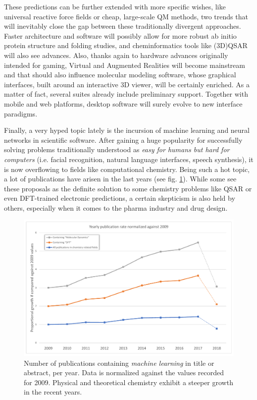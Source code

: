 These predictions can be further extended with more specific wishes, like universal reactive force fields or cheap, large-scale QM methods, two trends that will inevitably close the gap between these traditionally divergent approaches. Faster architecture and software will possibly allow for more robust ab initio protein structure and folding studies,\cite{Lee2017} and cheminformatics tools like (3D)QSAR will also see advances.\cite{Cherkasov2013} Also, thanks again to hardware advances originally intended for gaming, Virtual and Augmented Realities will become mainstream and that should also influence molecular modeling software, whose graphical interfaces, built around an interactive 3D viewer, will be certainly enriched. As a matter of fact, several suites already include preliminary support.\cite{chimerax} Together with mobile and web platforms, desktop software will surely evolve to new interface paradigms.

Finally, a very hyped topic lately is the incursion of machine learning and neural networks in scientific software. After gaining a huge popularity for successfully solving problems traditionally understood as \textit{easy for humans but hard for computers} (i.e. facial recognition, natural language interfaces, speech synthesis), it is now overflowing to fields like computational chemistry. Being such a hot topic, a lot of publications have arisen in the last years (see fig. \ref{fig:machinelearningtrends}). While some see these proposals as the definite solution to some chemistry problems like QSAR\cite{paliwal2015,Ma2015,schutt2016,goh2017,goh2017b,koutsoukas2017,mayr2016} or even DFT-trained electronic predictions,\cite{faber2017} a certain skepticism is also held by others,\cite{forbes4decades,benhenda} especially when it comes to the pharma industry and drug design.


\begin{figure}[H]
	\includegraphics[width=\textwidth]{./figures/01/publication-trends-ml_crop.pdf}
	\caption[Machine learning publication trends]{Number of publications containing \textit{machine learning}  in title or abstract, per year. Data is normalized against the values recorded for 2009. Physical and theoretical chemistry exhibit a steeper growth in the recent years.}
	\label{fig:machinelearningtrends}
\end{figure}


